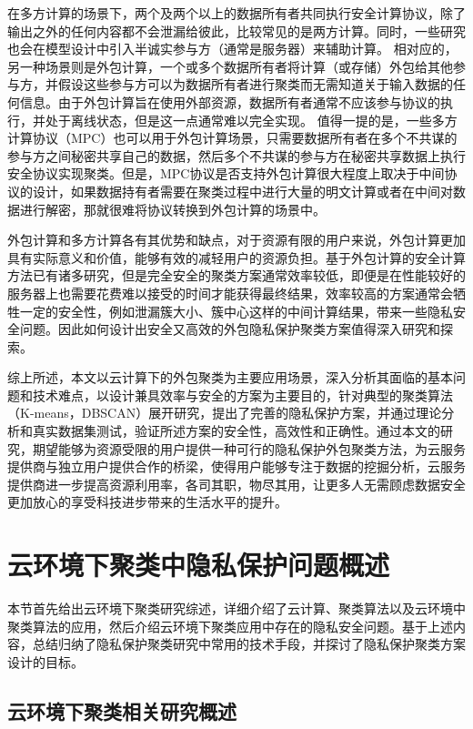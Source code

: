 在多方计算的场景下\cite{cramer2015secure}，两个及两个以上的数据所有者共同执行安全计算协议，除了输出之外的任何内容都不会泄漏给彼此，比较常见的是两方计算。同时，一些研究也会在模型设计中引入半诚实参与方（通常是服务器）来辅助计算。
相对应的，另一种场景则是外包计算\cite{li2018privacy}，一个或多个数据所有者将计算（或存储）外包给其他参与方，并假设这些参与方可以为数据所有者进行聚类而无需知道关于输入数据的任何信息。由于外包计算旨在使用外部资源，数据所有者通常不应该参与协议的执行，并处于离线状态，但是这一点通常难以完全实现。
值得一提的是，一些多方计算协议（MPC）也可以用于外包计算场景，只需要数据所有者在多个不共谋的参与方之间秘密共享自己的数据，然后多个不共谋的参与方在秘密共享数据上执行安全协议实现聚类。但是，MPC协议是否支持外包计算很大程度上取决于中间协议的设计，如果数据持有者需要在聚类过程中进行大量的明文计算或者在中间对数据进行解密，那就很难将协议转换到外包计算的场景中。

外包计算和多方计算各有其优势和缺点，对于资源有限的用户来说，外包计算更加具有实际意义和价值，能够有效的减轻用户的资源负担。基于外包计算的安全计算方法已有诸多研究，但是完全安全的聚类方案通常效率较低，即便是在性能较好的服务器上也需要花费难以接受的时间才能获得最终结果，效率较高的方案通常会牺牲一定的安全性，例如泄漏簇大小、簇中心这样的中间计算结果，带来一些隐私安全问题。因此如何设计出安全又高效的外包隐私保护聚类方案值得深入研究和探索。

综上所述，本文以云计算下的外包聚类为主要应用场景，深入分析其面临的基本问题和技术难点，以设计兼具效率与安全的方案为主要目的，针对典型的聚类算法（K-means，DBSCAN）展开研究，提出了完善的隐私保护方案，并通过理论分析和真实数据集测试，验证所述方案的安全性，高效性和正确性。通过本文的研究，期望能够为资源受限的用户提供一种可行的隐私保护外包聚类方法，为云服务提供商与独立用户提供合作的桥梁，使得用户能够专注于数据的挖掘分析，云服务提供商进一步提高资源利用率，各司其职，物尽其用，让更多人无需顾虑数据安全更加放心的享受科技进步带来的生活水平的提升。

\section{云环境下聚类中隐私保护问题概述}
本节首先给出云环境下聚类研究综述，详细介绍了云计算、聚类算法以及云环境中聚类算法的应用，然后介绍云环境下聚类应用中存在的隐私安全问题。基于上述内容，总结归纳了隐私保护聚类研究中常用的技术手段，并探讨了隐私保护聚类方案设计的目标。
\subsection{云环境下聚类相关研究概述}
